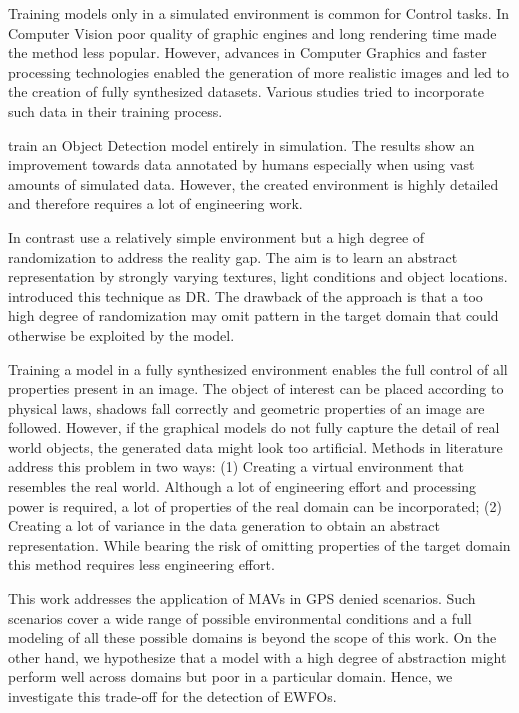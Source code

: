 Training models only in a simulated environment is common for Control tasks. In Computer Vision poor quality of graphic engines and long rendering time made the method less popular. However, advances in Computer Graphics and faster processing technologies enabled the generation of more realistic images and led to the creation of fully synthesized datasets\cite{Ros2016, Gaidon2016}. Various studies tried to incorporate such data in their training process.

\citeauthor{Johnson-Roberson2016} \cite{Johnson-Roberson2016} train an Object Detection model entirely in simulation. The results show an improvement towards data annotated by humans especially when using vast amounts of simulated data. However, the created environment is highly detailed and therefore requires a lot of engineering work. 

In contrast \cite{Sadeghi2016, Tobin2017, Tremblay2018a} use a relatively simple environment but a high degree of randomization to address the reality gap. The aim is to learn an abstract representation by strongly varying textures, light conditions and object locations. \citeauthor{Tobin2017} introduced this technique as \ac{DR}. The drawback of the approach is that a too high degree of randomization may omit pattern in the target domain that could otherwise be exploited by the model. 

Training a model in a fully synthesized environment enables the full control of all properties present in an image. The object of interest can be placed according to physical laws, shadows fall correctly and geometric properties of an image are followed. However, if the graphical models do not fully capture the detail of real world objects, the generated data might look too artificial. Methods in literature address this problem in two ways: (1) Creating a virtual environment that resembles the real world. Although a lot of engineering effort and processing power is required, a lot of properties of the real domain can be incorporated; (2) Creating a lot of variance in the data generation to obtain an abstract representation. While bearing the risk of omitting properties of the target domain this method requires less engineering effort.

This work addresses the application of \acp{MAV} in \ac{GPS} denied scenarios. Such scenarios cover a wide range of possible environmental conditions and a full modeling of all these possible domains is beyond the scope of this work. On the other hand, we hypothesize that a model with a high degree of abstraction might perform well across domains but poor in a particular domain. Hence, we investigate this trade-off for the detection of \acp{EWFO}.


